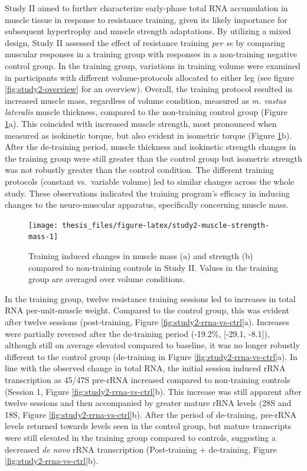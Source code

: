 \documentclass[twoside,10pt]{gihclass} %
\begin{document}
Study II aimed to further characterize early-phase total RNA accumulation in muscle tissue in response to resistance training, given its likely importance for subsequent hypertrophy and muscle strength adaptations.
By utilizing a mixed design, Study II assessed the effect of resistance training \emph{per se} by comparing muscular responses in a training group with responses in a non-training negative control group. In the training group, variations in training volume were examined in participants with different volume-protocols allocated to either leg (see figure \ref{fig:study2-overview} for an overview). Overall, the training protocol resulted in increased muscle mass, regardless of volume condition, measured as \emph{m. vastus lateralis} muscle thickness, compared to the non-training control group (Figure \ref{fig:study2-muscle-strength-mass}a). This coincided with increased muscle strength, most pronounced when measured as isokinetic torque, but also evident in isometric torque (Figure \ref{fig:study2-muscle-strength-mass}b).
After the de-training period, muscle thickness and isokinetic strength changes in the training group were still greater than the control group but isometric strength was not robustly greater than the control condition.
The different training protocols (constant vs.~variable volume) led to similar changes across the whole study.
These observations indicated the training program's efficacy in inducing changes to the neuro-muscular apparatus, specifically concerning muscle mass.
\begin{figure}

{\centering \texttt{[image: thesis\_files/figure-latex/study2-muscle-strength-mass-1]} 

}

\caption[Muscle mass and strength changes in Study II]{Training induced changes in muscle mass (a) and strength (b) compared to non-training controls in Study II. Values in the training group are averaged over volume conditions.}\label{fig:study2-muscle-strength-mass}
\end{figure}
In the training group, twelve resistance training sessions led to increases in total RNA per-unit-muscle weight. Compared to the control group, this was evident after twelve sessions (post-training, Figure \ref{fig:study2-rrna-vs-ctrl}a).
Increases were partially reversed after the de-training period (-19.2\%, {[}-29.1, -8.1{]}), although still on average elevated compared to baseline, it was no longer robustly different to the control group (de-training in Figure \ref{fig:study2-rrna-vs-ctrl}a).
In line with the observed change in total RNA, the initial session induced rRNA transcription as 45/47S pre-rRNA increased compared to non-training controls (Session 1, Figure \ref{fig:study2-rrna-vs-ctrl}b). This increase was still apparent after twelve sessions and then accompanied by greater mature rRNA levels (28S and 18S, Figure \ref{fig:study2-rrna-vs-ctrl}b). After the period of de-training, pre-rRNA levels returned towards levels seen in the control group, but mature transcripts were still elevated in the training group compared to controls, suggesting a decreased \emph{de novo} rRNA transcription (Post-training + de-training, Figure \ref{fig:study2-rrna-vs-ctrl}b).
\end{document}
